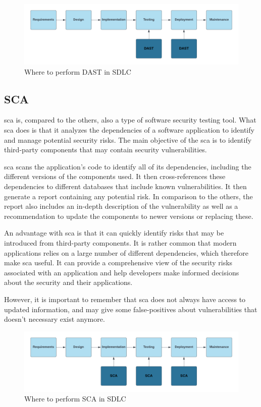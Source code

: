 \begin{figure}[htp]
    \centering
    \includegraphics[width=1\columnwidth]{Images/DAST.png}
    \caption{Where to perform DAST in SDLC} 
    \label{fig:my_label}
\end{figure}

\newpage

\subsection{SCA}
\acrlong{sca} is, compared to the others, also a type of software security testing tool. What \acrshort{sca} does is that it analyzes the dependencies of a software application to identify and manage potential security risks. The main objective of the \acrshort{sca} is to identify third-party components that may contain security vulnerabilities. \cite{sca}

 \acrshort{sca} scans the application's code to identify all of its dependencies, including the different versions of the components used. It then cross-references these dependencies to different databases that include known vulnerabilities. It then generate a report containing any potential risk. In comparison to the others, the report also includes an in-depth description of the vulnerability as well as a recommendation to update the components to newer versions or replacing these. 

An advantage with \acrshort{sca} is that it can quickly identify risks that may be introduced from third-party components. It is rather common that modern applications relies on a large number of  different dependencies, which therefore make \acrshort{sca} useful. It can provide a comprehensive view of the security risks associated with an application and help developers make informed decisions about the security and their applications. 

However, it is important to remember that \acrshort{sca} does not always have access to updated information, and may give some false-positives about vulnerabilities that doesn't necessary exist anymore. 


\begin{figure}[htp]
    \centering
    \includegraphics[width=1\columnwidth]{Images/SCA.png}
    \caption{Where to perform SCA in SDLC} 
    \label{fig:my_label}
\end{figure}

